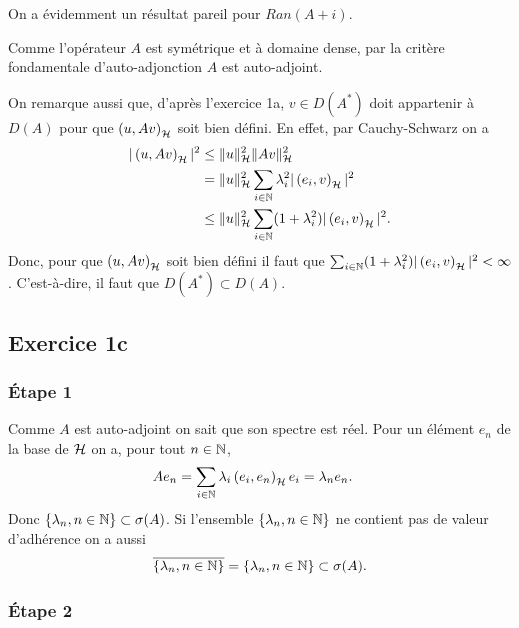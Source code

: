 On a évidemment un résultat pareil pour $Ran(A + i)$.

Comme l'opérateur $A$ est symétrique et à domaine dense,
par la critère fondamentale d'auto-adjonction
$A$ est auto-adjoint.

On remarque aussi que, d'après l'exercice 1a, $v \in D(A^*)$
doit appartenir à $D(A)$ pour que $\left( u, Av \right)_{\mathcal{H}}$ soit bien défini.
En effet, par Cauchy-Schwarz on a
\begin{align}
    |\left( u, Av \right)_{\mathcal{H}}|^2 & \leq \| u \|_{\mathcal{H}}^2 \| Av \|_{\mathcal{H}}^2 \\
    &= \| u \|_{\mathcal{H}}^2 \sum_{i \in \mathbb{N}} \lambda_i^2 |\left( e_i, v \right)_{\mathcal{H}}|^2 \\
    & \leq \| u \|_{\mathcal{H}}^2 \sum_{i \in \mathbb{N}} (1 + \lambda_i^2) |\left( e_i, v \right)_{\mathcal{H}}|^2.
\end{align}
%
Donc, pour que $\left( u, Av \right)_{\mathcal{H}}$ soit bien défini il faut que
$\sum_{i \in \mathbb{N}} (1 + \lambda_i^2) |\left( e_i, v \right)_{\mathcal{H}}|^2 < \infty$.
C'est-à-dire, il faut que $D(A^*) \subset D(A)$.


\subsection*{Exercice 1c}

\subsubsection*{Étape 1}

Comme $A$ est auto-adjoint on sait que son spectre est réel.
Pour un élément $e_n$ de la base de $\mathcal{H}$ on a, pour tout
${n \in \mathbb{N}}$,
\begin{align}
    A e_n &= \sum_{i \in \mathbb{N}} \lambda_i \left( e_i, e_n \right)_{\mathcal{H}} e_i
    = \lambda_n e_n.
\end{align}
%
Donc $\{ \lambda_n, {n \in \mathbb{N}} \} \subset \sigma(A)$.
Si l'ensemble $\{ \lambda_n, {n \in \mathbb{N}} \}$ ne contient pas de
valeur d'adhérence on a aussi
\begin{align}
    \overline{ \{ \lambda_n, {n \in \mathbb{N}} \} } = \{ \lambda_n, {n \in \mathbb{N}} \}
    \subset \sigma(A).
\end{align}

\subsubsection*{Étape 2}

